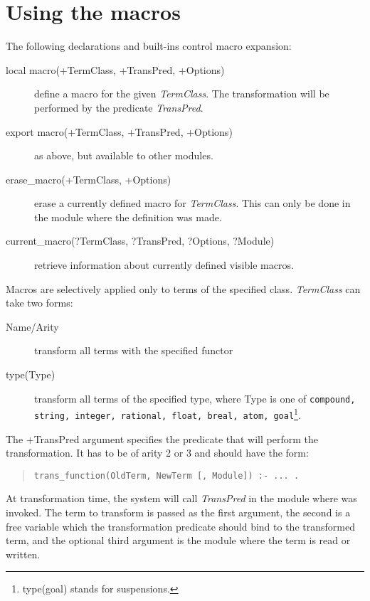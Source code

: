 \section{Using the macros}
\label{usingmacros}

The following declarations and built-ins control macro expansion:
\begin{description}
\item[local macro(+TermClass, +TransPred, +Options)]
define a macro for the given {\it TermClass}. The transformation will
be performed by the predicate {\it TransPred}.
\item[export macro(+TermClass, +TransPred, +Options)]
as above, but available to other modules.
\item[erase_macro(+TermClass, +Options)]
erase a currently defined macro for {\it TermClass}. This can only be done
in the module where the definition was made.
\item[current_macro(?TermClass, ?TransPred, ?Options, ?Module)]
retrieve information about currently defined visible macros.
\end{description}
Macros are selectively applied only to terms of the specified class.
{\it TermClass} can take two forms:
\begin{description}
\item[Name/Arity] transform all terms with the specified functor
\item[type(Type)] transform all terms of the specified type, where Type
is one of {\tt compound, string, integer, rational, float, breal, atom,
goal}\footnote{type(goal) stands for suspensions.}.
\end{description}
The {+TransPred} argument specifies the predicate that will perform the
transformation. It has to be of arity 2 or 3 and should have the form:
\begin{quote}\begin{verbatim}
trans_function(OldTerm, NewTerm [, Module]) :- ... .
\end{verbatim}\end{quote}
At transformation time, the system will call {\it TransPred} in the module
where  was invoked.
The term to transform is passed as the first argument, the second is a free
variable which the transformation predicate should bind to the
transformed term, and the optional
third argument is the module where the term is read or written.

